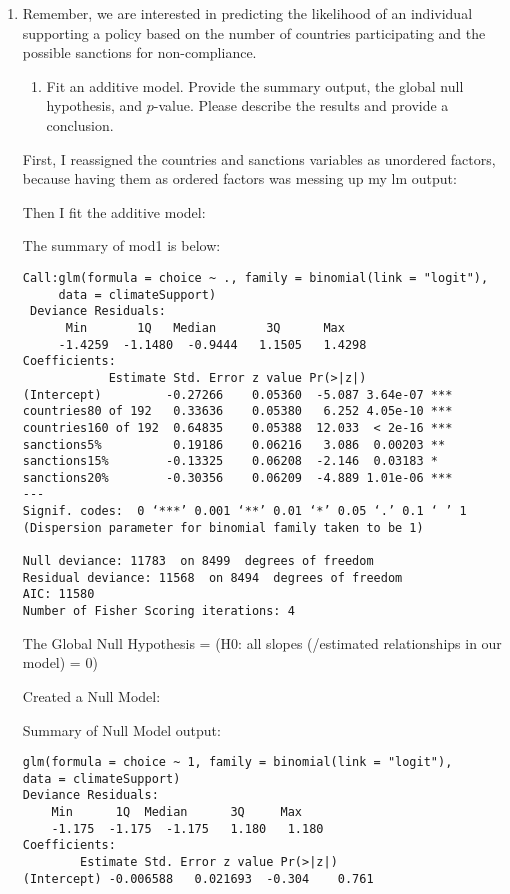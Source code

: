 \documentclass[12pt,letterpaper]{article}
\begin{document}
\begin{enumerate}
	\item
	Remember, we are interested in predicting the likelihood of an individual supporting a policy based on the number of countries participating and the possible sanctions for non-compliance.
	\begin{enumerate}
		\item [] Fit an additive model. Provide the summary output, the global null hypothesis, and $p$-value. Please describe the results and provide a conclusion.
	\end{enumerate}
	
First, I reassigned the countries and sanctions variables as unordered factors, because having them as ordered factors was messing up my lm output:
 

Then I fit the additive model:
 	

The summary of mod1 is below:
\begin{verbatim}
Call:glm(formula = choice ~ ., family = binomial(link = "logit"),
     data = climateSupport)
 Deviance Residuals:
      Min       1Q   Median       3Q      Max
     -1.4259  -1.1480  -0.9444   1.1505   1.4298
Coefficients:
            Estimate Std. Error z value Pr(>|z|)
(Intercept)         -0.27266    0.05360  -5.087 3.64e-07 ***
countries80 of 192   0.33636    0.05380   6.252 4.05e-10 ***
countries160 of 192  0.64835    0.05388  12.033  < 2e-16 ***
sanctions5%          0.19186    0.06216   3.086  0.00203 **
sanctions15%        -0.13325    0.06208  -2.146  0.03183 *  
sanctions20%        -0.30356    0.06209  -4.889 1.01e-06 ***
---
Signif. codes:  0 ‘***’ 0.001 ‘**’ 0.01 ‘*’ 0.05 ‘.’ 0.1 ‘ ’ 1
(Dispersion parameter for binomial family taken to be 1)    

Null deviance: 11783  on 8499  degrees of freedom
Residual deviance: 11568  on 8494  degrees of freedom
AIC: 11580
Number of Fisher Scoring iterations: 4
\end{verbatim}	

The Global Null Hypothesis = (H0: all slopes (/estimated relationships in our model) = 0)

Created a Null Model:
 	
Summary of Null Model output:
\begin{verbatim}	
glm(formula = choice ~ 1, family = binomial(link = "logit"),     
data = climateSupport)
Deviance Residuals:
    Min      1Q  Median      3Q     Max  
    -1.175  -1.175  -1.175   1.180   1.180
Coefficients:             
		Estimate Std. Error z value Pr(>|z|)
(Intercept) -0.006588   0.021693  -0.304    0.761


\end{verbatim}
\end{enumerate}
\end{document}
